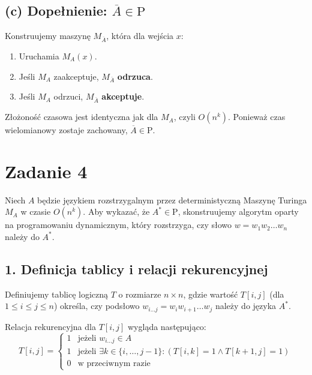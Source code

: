 \documentclass{article}
\begin{document}
\subsection*{(c) Dopełnienie: $\overline{A} \in \text{P}$}

Konstruujemy maszynę $M_{\overline{A}}$, która dla wejścia $x$:
\begin{enumerate}
    \item Uruchamia $M_A(x)$.
    \item Jeśli $M_A$ zaakceptuje, $M_{\overline{A}}$ \textbf{odrzuca}.
    \item Jeśli $M_A$ odrzuci, $M_{\overline{A}}$ \textbf{akceptuje}.
\end{enumerate}
Złożoność czasowa jest identyczna jak dla $M_A$, czyli $O(n^k)$. Ponieważ czas wielomianowy zostaje zachowany, $\overline{A} \in \text{P}$.


\section{Zadanie 4}
Niech $A$ będzie językiem rozstrzygalnym przez deterministyczną Maszynę Turinga $M_A$ w czasie $O(n^k)$. Aby wykazać, że $A^* \in \text{P}$, skonstruujemy algorytm oparty na programowaniu dynamicznym, który rozstrzyga, czy słowo $w = w_1w_2\dots w_n$ należy do $A^*$.

\subsection*{1. Definicja tablicy i relacji rekurencyjnej}
Definiujemy tablicę logiczną $T$ o rozmiarze $n \times n$, gdzie wartość $T[i,j]$ (dla $1 \le i \le j \le n$) określa, czy podsłowo $w_{i \dots j} = w_i w_{i+1} \dots w_j$ należy do języka $A^*$.

Relacja rekurencyjna dla $T[i,j]$ wygląda następująco:
\[
T[i,j] =
\begin{cases}
1 & \text{jeżeli } w_{i \dots j} \in A \\
1 & \text{jeżeli } \exists k \in \{i, \dots, j-1\} : (T[i,k] = 1 \land T[k+1,j] = 1) \\
0 & \text{w przeciwnym razie}
\end{cases}
\]
\end{document}
